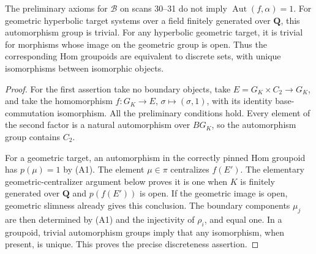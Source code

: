 \begin{proposition}
\label{A:abstract-rigidity}
The preliminary axioms for $\mathcal B$ on scans 30--31 do not imply
$\operatorname{Aut}(f,\alpha)=1$.  For geometric hyperbolic target
systems over a field finitely generated over $\mathbf Q$, this
automorphism group is trivial.  For any hyperbolic geometric target,
it is trivial for morphisms whose image on the geometric group is
open.  Thus the corresponding Hom groupoids are equivalent to
discrete sets, with unique isomorphisms between isomorphic objects.
\end{proposition}
\begin{proof}
For the first assertion take no boundary objects, take
$E=G_K\times C_2\to G_K$, and take the homomorphism
$f:G_K\to E$, $\sigma\mapsto(\sigma,1)$, with its identity
base-commutation isomorphism.  All the preliminary conditions hold.
Every element of the second factor is a natural automorphism over
$BG_K$, so the automorphism group contains $C_2$.

For a geometric target, an automorphism in the correctly pinned
Hom groupoid has $p(\mu)=1$ by (A1).  The element $\mu\in\pi$
centralizes $f(E')$.  The elementary geometric-centralizer argument
below proves it is one when $K$ is finitely generated over
$\mathbf Q$ and $p(f(E'))$ is open.  If the geometric image is
open, geometric slimness already gives this conclusion.  The
boundary components $\mu_j$ are then determined by (A1) and the
injectivity of $\rho_i$, and equal one.  In a groupoid, trivial
automorphism groups imply that any isomorphism, when present, is
unique.  This proves the precise discreteness assertion.
\end{proof}

